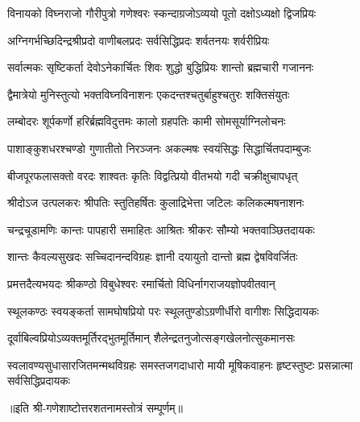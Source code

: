 
\twolineshloka
{विनायको विघ्नराजो गौरीपुत्रो गणेश्वरः}
{स्कन्दाग्रजोऽव्ययो पूतो दक्षोऽध्यक्षो द्विजप्रियः}

\twolineshloka
{अग्निगर्भच्छिदिन्द्रश्रीप्रदो वाणीबलप्रदः}
{सर्वसिद्धिप्रदः शर्वतनयः शर्वरीप्रियः}

\twolineshloka
{सर्वात्मकः सृष्टिकर्ता देवोऽनेकार्चितः शिवः}
{शुद्धो बुद्धिप्रियः शान्तो ब्रह्मचारी गजाननः}

\twolineshloka
{द्वैमात्रेयो मुनिस्तुत्यो भक्तविघ्नविनाशनः}
{एकदन्तश्चतुर्बाहुश्चतुरः शक्तिसंयुतः}

\twolineshloka
{लम्बोदरः शूर्पकर्णो हरिर्ब्रह्मविदुत्तमः}
{कालो ग्रहपतिः कामी सोमसूर्याग्निलोचनः}

\twolineshloka
{पाशाङ्कुशधरश्चण्डो गुणातीतो निरञ्जनः}
{अकल्मषः स्वयंसिद्धः सिद्धार्चितपदाम्बुजः}

\twolineshloka
{बीजपूरफलासक्तो वरदः शाश्वतः कृतिः}
{विद्वत्प्रियो वीतभयो गदी चक्रीक्षुचापधृत्}

\twolineshloka
{श्रीदोऽज उत्पलकरः श्रीपतिः स्तुतिहर्षितः}
{कुलाद्रिभेत्ता जटिलः कलिकल्मषनाशनः}

\twolineshloka
{चन्द्रचूडामणिः कान्तः पापहारी समाहितः}
{आश्रितः श्रीकरः सौम्यो भक्तवाञ्छितदायकः}

\twolineshloka
{शान्तः कैवल्यसुखदः सच्चिदानन्दविग्रहः}
{ज्ञानी दयायुतो दान्तो ब्रह्म द्वेषविवर्जितः}

\twolineshloka
{प्रमत्तदैत्यभयदः श्रीकण्ठो विबुधेश्वरः}
{रमार्चितो विधिर्नागराजयज्ञोपवीतवान्}

\twolineshloka
{स्थूलकण्ठः स्वयङ्कर्ता सामघोषप्रियो परः}
{स्थूलतुण्डोऽग्रणीर्धीरो वागीशः सिद्धिदायकः}

\twolineshloka
{दूर्वाबिल्वप्रियोऽव्यक्तमूर्तिरद्भुतमूर्तिमान्}
{शैलेन्द्रतनुजोत्सङ्गखेलनोत्सुकमानसः}

\threelineshloka
{स्वलावण्यसुधासारजितमन्मथविग्रहः}
{समस्तजगदाधारो मायी मूषिकवाहनः}
{हृष्टस्तुष्टः प्रसन्नात्मा सर्वसिद्धिप्रदायकः}

{॥इति श्री-गणेशाष्टोत्तरशतनामस्तोत्रं सम्पूर्णम्॥}
